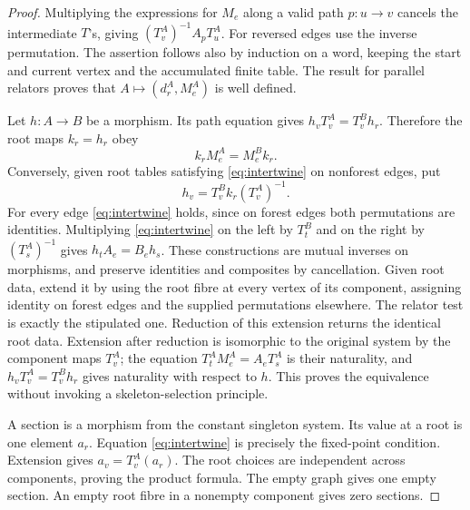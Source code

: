\begin{proof}
Multiplying the expressions for $M_e$ along a valid path $p:u\to v$ cancels the intermediate $T$'s, giving $(T_v^A)^{-1}A_pT_u^A$. For reversed edges use the inverse permutation. The assertion follows also by induction on a word, keeping the start and current vertex and the accumulated finite table. The result for parallel relators proves that $A\mapsto (d_r^A,M_e^A)$ is well defined.

Let $h:A\to B$ be a morphism. Its path equation gives $h_vT_v^A=T_v^B h_r$. Therefore the root maps $k_r=h_r$ obey
\begin{equation}
                    k_r M^A_e=M^B_e k_r. \label{eq:intertwine}
\end{equation}
Conversely, given root tables satisfying \eqref{eq:intertwine} on nonforest edges, put
\[
                    h_v=T_v^B k_r (T_v^A)^{-1}.
\]
For every edge \eqref{eq:intertwine} holds, since on forest edges both permutations are identities. Multiplying \eqref{eq:intertwine} on the left by $T_t^B$ and on the right by $(T_s^A)^{-1}$ gives $h_tA_e=B_eh_s$. These constructions are mutual inverses on morphisms, and preserve identities and composites by cancellation. Given root data, extend it by using the root fibre at every vertex of its component, assigning identity on forest edges and the supplied permutations elsewhere. The relator test is exactly the stipulated one. Reduction of this extension returns the identical root data. Extension after reduction is isomorphic to the original system by the component maps $T_v^A$; the equation $T_t^A M^A_e=A_e T_s^A$ is their naturality, and $h_vT_v^A=T_v^B h_r$ gives naturality with respect to $h$. This proves the equivalence without invoking a skeleton-selection principle.

A section is a morphism from the constant singleton system. Its value at a root is one element $a_r$. Equation \eqref{eq:intertwine} is precisely the fixed-point condition. Extension gives $a_v=T_v^A(a_r)$. The root choices are independent across components, proving the product formula. The empty graph gives one empty section. An empty root fibre in a nonempty component gives zero sections.
\end{proof}

